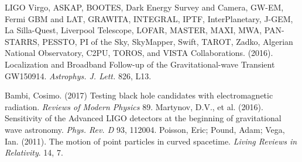   LIGO Virgo, ASKAP, BOOTES, Dark Energy Survey and Camera, GW-EM, Fermi GBM and LAT, GRAWITA, INTEGRAL, IPTF, InterPlanetary, J-GEM, La Silla-Quest, Liverpool Telescope, LOFAR, MASTER, MAXI, MWA, PAN-STARRS, PESSTO, PI of the Sky, SkyMapper, Swift, TAROT, Zadko, Algerian National Observatory, C2PU, TOROS, and VISTA Collaborations. (2016). Localization and Broadband Follow-up of the Gravitational-wave Transient GW150914. {\em Astrophys. J. Lett.} 826, L13.
  
  Bambi, Cosimo. (2017) Testing black hole candidates with electromagnetic radiation. {\em Reviews of Modern Physics} 89.
  Martynov, D.V., et al. (2016). Sensitivity of the Advanced LIGO detectors at the beginning of gravitational wave astronomy. {\em Phys. Rev. D} 93, 112004.
  Poisson, Eric; Pound, Adam; Vega, Ian. (2011). The motion of point particles in curved spacetime. {\em Living Reviews in Relativity}. 14, 7. 
